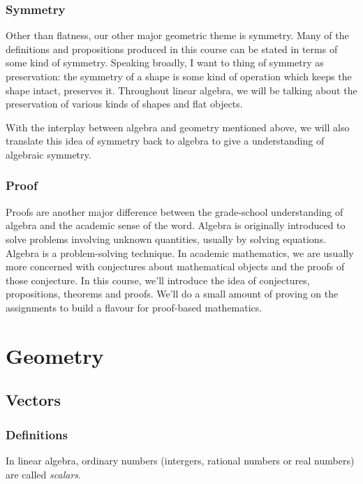 \documentclass[fleqn]{report}
\begin{document}
\subsection{Symmetry}
\label{symmetry}

Other than flatness, our other major geometric theme is
symmetry. Many of the definitions and propositions produced in
this course can be stated in terms of some kind of symmetry.
Speaking broadly, I want to thing of symmetry as preservation:
the symmetry of a shape is some kind of operation which keeps
the shape intact, preserves it. Throughout linear algebra, we
will be talking about the preservation of various kinds of
shapes and flat objects.

With the interplay between algebra and geometry mentioned
above, we will also translate this idea of symmetry back to
algebra to give a understanding of algebraic symmetry. 

\subsection{Proof}
\label{proof}

Proofs are another major difference between the grade-school
understanding of algebra and the academic sense of the word.
Algebra is originally introduced to solve problems involving
unknown quantities, usually by solving equations. Algebra is a
problem-solving technique. In academic mathematics, we are
usually more concerned with conjectures about mathematical
objects and the proofs of those conjecture. In this course,
we'll introduce the idea of conjectures, propositions,
theorems and proofs. We'll do a small amount of proving on the
assignments to build a flavour for proof-based mathematics.

\chapter{Geometry}
\label{geometry}

\section{Vectors}
\label{vectors}

\subsection{Definitions}
\label{vector-definitions}

\begin{defn}
In linear algebra, ordinary numbers (intergers, rational
numbers or real numbers) are called \emph{scalars}.
\end{defn}
\end{document}
